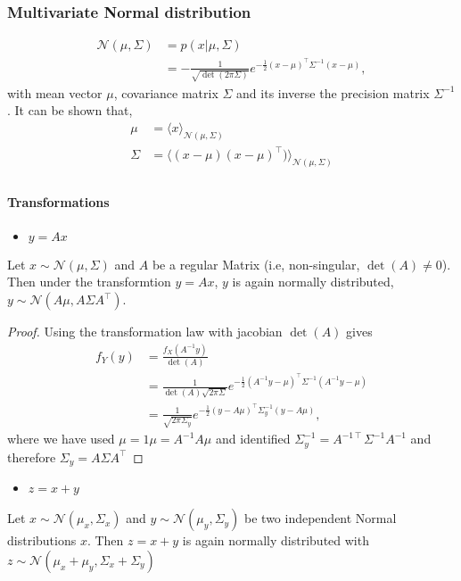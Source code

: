 \subsubsection*{Multivariate Normal distribution}
\begin{align}
\mathcal{N}(\mu, \Sigma) &= p(x|\mu, \Sigma) \\ 
 &= -\frac{1}{\sqrt{\det(2\pi\Sigma)}}e^{-\frac{1}{2}(x-\mu)^\intercal \Sigma^{-1} (x-\mu)},
\end{align}
with mean vector $\mu$, covariance matrix $\Sigma$ and its inverse the  precision matrix $\Sigma^{-1}$.
It can be shown that,
\begin{align}
\mu &= \langle x \rangle_{\mathcal{N}(\mu, \Sigma)} \\ 
\Sigma &= \langle (x-\mu) (x-\mu)^ \intercal ) \rangle_{\mathcal{N}(\mu, \Sigma)} \\ 
\end{align}

\paragraph*{Transformations}
\begin{itemize}
\item $y=Ax$
\end{itemize}
Let $x\sim \mathcal{N}(\mu, \Sigma)$ and $A$ be a regular  Matrix (i.e, non-singular, $\det(A)\neq 0 $). Then under the  transformtion $y=Ax$,  $y$ is again normally distributed, $y \sim \mathcal{N}(A\mu, A\Sigma A^\intercal)$.
\begin{proof}
Using the transformation law with jacobian $\det(A)$ gives 
\begin{align*}
f_Y(y) &= \frac{f_X(A^{-1}y)}{\det(A)} \\
&= \frac{1}{\det(A) \sqrt{2\pi\Sigma}} e^{-\frac{1}{2} (A^{-1}y-\mu)^\intercal \Sigma^{-1} (A^{-1}y-\mu)} \\
&=  \frac{1}{\sqrt{2\pi\Sigma_y}} e^{-\frac{1}{2} (y-A\mu)^\intercal \Sigma_y^{-1} (y-A\mu)},
\end{align*}
where we have used $\mu = 1 \mu = A^{-1} A \mu$ and identified $\Sigma_y^{-1} = A ^{-1\intercal} \Sigma^{-1} A^{-1}$ and therefore $\Sigma_y = A \Sigma A^\intercal$ 

\end{proof}
\begin{itemize}
\item $z=x + y$
\end{itemize}
Let $x\sim \mathcal{N}(\mu_x, \Sigma_x)$ and $y\sim \mathcal{N}(\mu_y, \Sigma_y)$ be two independent Normal distributions $x$. Then $z=x+y$ is again normally distributed with $z \sim \mathcal{N}(\mu_x + \mu_y, \Sigma_x + \Sigma_y)$


